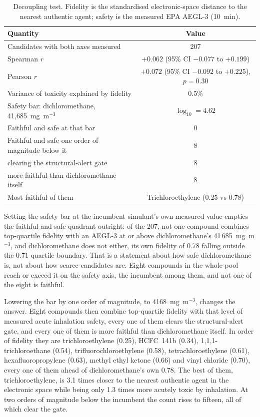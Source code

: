 \documentclass[11pt,a4paper]{article}
\begin{document}
\begin{table}[!htb]
\centering
\caption{Decoupling test. Fidelity is the standardised electronic-space distance to
the nearest authentic agent; safety is the measured EPA AEGL-3 (10~min).}
\label{tab:h1}
\small
\begin{tabular}{lc}
\hline
Quantity & Value \\
\hline
Candidates with both axes measured & 207 \\
Spearman $r$ & $+0.062$ (95\% CI $-0.077$ to $+0.199$) \\
Pearson $r$ & $+0.072$ (95\% CI $-0.092$ to $+0.225$), $p = 0.30$ \\
Variance of toxicity explained by fidelity & 0.5\% \\
\hline
Safety bar: dichloromethane, 41,685~mg~m$^{-3}$ & $\log_{10} = 4.62$ \\
Faithful and safe at that bar & 0 \\
Faithful and safe one order of magnitude below it & 8 \\
\quad clearing the structural-alert gate & 8 \\
\quad more faithful than dichloromethane itself & 8 \\
Most faithful of them & Trichloroethylene (0.25 vs 0.78) \\
\hline
\end{tabular}
\end{table}

Setting the safety bar at the incumbent simulant's own measured value empties the
faithful-and-safe quadrant outright: of the 207, not one compound combines
top-quartile fidelity with an AEGL-3 at or above dichloromethane's
41\,685~mg~m$^{-3}$, and dichloromethane does not either, its own fidelity of
0.78 falling outside the 0.71 quartile boundary. That is a statement
about how safe dichloromethane is, not about how scarce candidates are. Eight
compounds in the whole pool reach or exceed it on the safety axis, the incumbent
among them, and not one of the eight is faithful.

Lowering the bar by one order of magnitude, to 4168~mg~m$^{-3}$, changes the
answer. Eight compounds then combine top-quartile fidelity with that level of
measured acute inhalation safety, every one of them clears the structural-alert
gate, and every one of them is more faithful than dichloromethane itself. In
order of fidelity they are trichloroethylene (0.25), HCFC~141b (0.34),
1,1,1-trichloroethane (0.54), trifluorochloroethylene (0.58),
tetrachloroethylene (0.61), hexafluoropropylene (0.63), methyl ethyl ketone
(0.66) and vinyl chloride (0.70), every one of them ahead of dichloromethane's
own 0.78. The best of them,
trichloroethylene, is 3.1 times closer to the nearest authentic agent in the
electronic space while being only 1.3 times more acutely toxic by inhalation. At
two orders of magnitude below the incumbent the count rises to fifteen, all of
which clear the gate.
\end{document}
